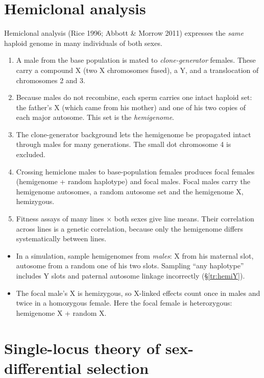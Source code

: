 \section{Hemiclonal analysis}\label{sec:hemiclone}
Hemiclonal analysis (Rice 1996; Abbott \& Morrow 2011) expresses the \emph{same} haploid genome in many individuals of both sexes.
\begin{enumerate}
\item A male from the base population is mated to \emph{clone-generator} females. These carry a compound X (two X chromosomes fused), a Y, and a translocation of chromosomes 2 and 3.
\item Because males do not recombine, each sperm carries one intact haploid set: the father's X (which came from his mother) and one of his two copies of each major autosome. This set is the \emph{hemigenome}.
\item The clone-generator background lets the hemigenome be propagated intact through males for many generations. The small dot chromosome 4 is excluded.
\item Crossing hemiclone males to base-population females produces focal females (hemigenome + random haplotype) and focal males. Focal males carry the hemigenome autosomes, a random autosome set and the hemigenome X, hemizygous.
\item Fitness assays of many lines $\times$ both sexes give line means. Their correlation across lines is a genetic correlation, because only the hemigenome differs systematically between lines.
\end{enumerate}

\begin{warnbox}
\begin{itemize}
\item In a simulation, sample hemigenomes from \emph{males}: X from his maternal slot, autosome from a random one of his two slots. Sampling ``any haplotype'' includes Y slots and paternal autosome linkage incorrectly (\S\ref{tr:hemiY}).
\item The focal male's X is hemizygous, so X-linked effects count once in males and twice in a homozygous female. Here the focal female is heterozygous: hemigenome X + random X.
\end{itemize}
\end{warnbox}

\section{Single-locus theory of sex-differential selection}
